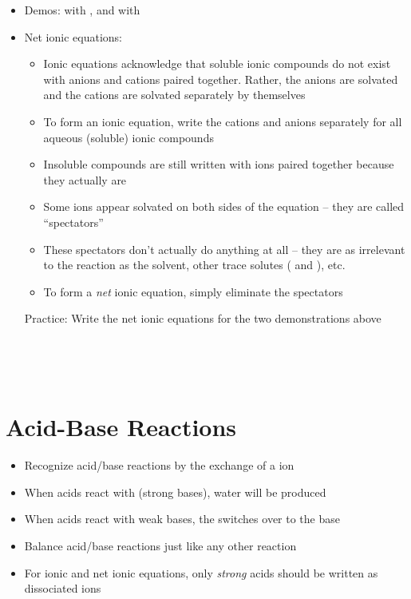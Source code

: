 \documentclass[12pt, openany, letterpaper]{memoir}
\begin{document}
\begin{itemize}
	\item Demos:  with , and  with 
	\item Net ionic equations:
	\begin{itemize}
		\item Ionic equations acknowledge that soluble ionic compounds do not exist with anions and cations paired together. Rather, the anions are solvated and the cations are solvated separately by themselves
		\item To form an ionic equation, write the cations and anions separately for all aqueous (soluble) ionic compounds
		\item Insoluble compounds are still written with ions paired together because they actually are
		\item Some ions appear solvated on both sides of the equation -- they are called ``spectators''
		\item These spectators don't actually do anything at all -- they are as irrelevant to the reaction as the solvent, other trace solutes ( and ), etc.
		\item To form a \emph{net} ionic equation, simply eliminate the spectators
	\end{itemize}
	
	Practice: Write the net ionic equations for the two demonstrations above
	
	~\hphantom{Practice:} 
	
	~\hphantom{Practice:} 
\end{itemize}
\section{Acid-Base Reactions}
\begin{itemize}
	\item Recognize acid/base reactions by the exchange of a  ion
	\item When acids react with  (strong bases), water will be produced
	\item When acids react with weak bases, the  switches over to the base
	\item Balance acid/base reactions just like any other reaction
	\item For ionic and net ionic equations, only \emph{strong} acids should be written as dissociated ions
\end{itemize}
\end{document}
